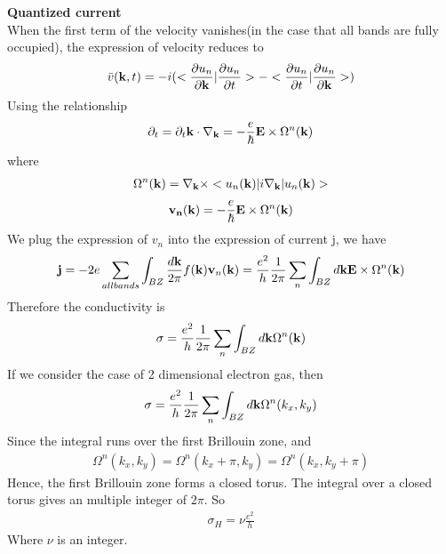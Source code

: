 \documentclass[a4paper]{article}
\begin{document}
{\bf Quantized current}\\
When the first term of the velocity vanishes(in the case that all bands are fully occupied), the expression of velocity reduces to
\begin{align}
	\bar v({\bf k},t) = - i  (<\frac{\partial u_n}{\partial {\bf k}}| \frac{\partial u_n}{\partial t}> -<\frac{\partial u_n}{\partial t}| \frac{\partial u_n}{\partial {\bf k}}>)
\end{align}
Using the relationship 
\begin{align*}
	\partial_t = \partial_t {\bf k} \cdot \nabla_{\bf k} = -\frac{e}{\hbar} {\bf E} \times \Omega^n({\bf k})
\end{align*}
where 
\begin{align*}
	\Omega^{n}({\bf k}) = \nabla_{\bf k} \times <u_n({\bf k})|i\nabla_{\bf k}|u_n({\bf k})>
\end{align*}
\begin{align*}
	{\bf v_n}({\bf k}) = - \frac{e}{\hbar} {\bf E} \times \Omega^{n}({\bf k})
\end{align*}
We plug the expression of $v_n$ into the expression of current j, we have
\begin{align*}
	{\bf j} = -2e\sum_{all bands}\int_{BZ}\frac{d{\bf k}}{2 \pi} f({\bf k}){\bf v}_n({\bf k}) 
	 = \frac{e^2}{h} \frac{1}{2 \pi} \sum_n \int_{BZ} d{\bf k} {\bf E} \times \Omega^n({\bf k})
\end{align*}
Therefore the conductivity is
\begin{align*}
	\sigma = \frac{e^2}{h} \frac{1}{2 \pi} \sum_n \int_{BZ} d{\bf k} \Omega^n({\bf k})
\end{align*}
If we consider the case of 2 dimensional electron gas, then 
\begin{align*}
	\sigma = \frac{e^2}{h} \frac{1}{2 \pi} \sum_n \int_{BZ} d{\bf k} \Omega^n(k_x, k_y)
\end{align*}
Since the integral runs over the first Brillouin zone, and
\begin{align*}
	\Omega^n(k_x, k_y) = \Omega^n(k_x+\pi, k_y) = \Omega^n(k_x, k_y + \pi)
\end{align*}
Hence, the first Brillouin zone forms a closed torus. The integral over a closed torus gives an multiple integer of $2\pi$. So
\begin{align*}
	\sigma_H = \nu \frac{e^2}{h}
\end{align*}
Where $\nu$ is an integer.
\end{document}
